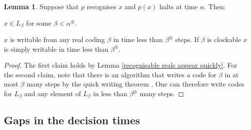 \documentclass[a4paper,11pt]{amsart}
\theoremstyle{definition}
\newtheorem{lemma}[fact]{Lemma}
\newtheorem*{problem A}{Problem 1}
\newtheorem*{problem B}{Problem 2}
\theoremstyle{remark}
\newenvironment{enumerate-(1)}{\begin{enumerate}[label={\upshape (\arabic*)}, leftmargin=2pc]}{\end{enumerate}}
\begin{document}
\begin{lemma}{\label{bounded writing time}} 
Suppose that $p$ recognises $x$ and $p(x)$ halts at time $\alpha$. Then: 
\begin{enumerate-(1)} 
\item 
$x\in L_\beta$ for some $\beta< \alpha^\oplus$. 
\item
 $x$ is writable from any real coding $\beta$ in time less than $\beta^\oplus$ steps. 
 If $\beta$ is clockable $x$ is simply writable  in time less than $\beta^\oplus$.

\end{enumerate-(1)} 
\end{lemma}
\begin{proof} 
The first claim holds by Lemma \ref{recognisable reals appear quickly}. 
For the second claim,
note that there is an algorithm that writes a code for $\beta$ in at most $\beta$ many steps by the quick writing theorem  \cite[Lemma 48]{welch2009characteristics}. 
One can therefore write codes for $L_\beta$ and any element of $L_\beta$ in less than $\beta^\oplus$ many steps. 
\end{proof} 



\subsection{Gaps in the decision times}
\label{section - gaps} 
\end{document}
